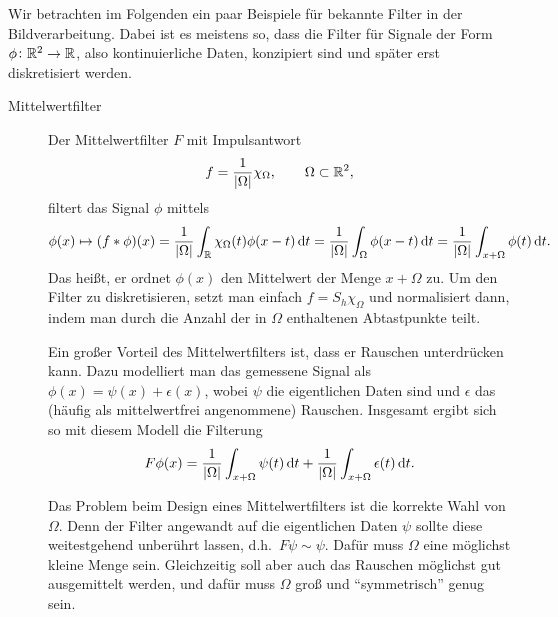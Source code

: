 \begin{example}
Wir betrachten im Folgenden ein paar Beispiele für bekannte Filter in der Bildverarbeitung. Dabei
ist es meistens so, dass die Filter für Signale der Form $ \phi \colon \mathbb{R}^{2} \rightarrow \mathbb{R} $, 
also kontinuierliche Daten, konzipiert sind und später erst diskretisiert werden.
\begin{description}
\item [Mittelwertfilter] Der Mittelwertfilter $ F $ mit Impulsantwort
  \[
    f = \frac{1}{|\Omega|}\chi_{\Omega}, \qquad \Omega \subset \mathbb{R}^{2},
  \]
  filtert das Signal $ \phi $ mittels
  \[
      \phi(x) \mapsto (f * \phi)(x)
    = \frac{1}{|\Omega|} \int_{\R} \chi_{\Omega}(t) \phi(x - t) \dif t
    = \frac{1}{|\Omega|} \int_{\Omega} \phi(x - t) \dif t
    = \frac{1}{|\Omega|} \int_{x + \Omega} \phi(t) \dif t.
  \]
  Das heißt, er ordnet $ \phi(x) $ den Mittelwert der Menge $ x + \Omega $ zu. Um den Filter zu
  diskretisieren, setzt man einfach $ f = S_{h}\chi_{\Omega} $ und normalisiert dann, indem man 
  durch die Anzahl der in $ \Omega $ enthaltenen Abtastpunkte teilt.
  
  Ein großer Vorteil des Mittelwertfilters ist, dass er Rauschen unterdrücken kann. Dazu modelliert
  man das gemessene Signal als $ \phi(x) = \psi(x) + \epsilon(x) $, wobei $ \psi $ die eigentlichen
  Daten sind und $ \epsilon $ das (häufig als mittelwertfrei angenommene) Rauschen. Insgesamt ergibt
  sich so mit diesem Modell die Filterung
  \[
      F\phi (x)
    = \frac{1}{|\Omega|} \int_{x + \Omega} \psi(t) \dif t
        + \frac{1}{|\Omega|} \int_{x + \Omega} \epsilon(t) \dif t.
  \]
  
  Das Problem beim Design eines Mittelwertfilters ist die korrekte Wahl von $ \Omega $. Denn der 
  Filter angewandt auf die eigentlichen Daten $ \psi $ sollte diese weitestgehend unberührt lassen, 
  d.h.\ $ F\psi \sim \psi $. Dafür muss $ \Omega $ eine möglichst kleine Menge sein. Gleichzeitig 
  soll aber auch das Rauschen möglichst gut ausgemittelt werden, und dafür muss $ \Omega $ groß und
  \enquote{symmetrisch} genug sein.
  

\end{description}
\end{example}
